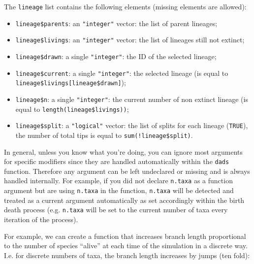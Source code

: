 \documentclass[]{book}
\providecommand{\tightlist}{%
  \setlength{\itemsep}{0pt}\setlength{\parskip}{0pt}}
\begin{document}
The \texttt{lineage} list contains the following elements (missing elements are allowed):

\begin{itemize}
\tightlist
\item
  \texttt{lineage\$parents}: an \texttt{"integer"} vector: the list of parent lineages;
\item
  \texttt{lineage\$livings}: an \texttt{"integer"} vector: the list of lineages still not extinct;
\item
  \texttt{lineage\$drawn}: a single \texttt{"integer"}: the ID of the selected lineage;
\item
  \texttt{lineage\$current}: a single \texttt{"integer"}: the selected lineage (is equal to \texttt{lineage\$livings{[}lineage\$drawn{]}});
\item
  \texttt{lineage\$n}: a single \texttt{"integer"}: the current number of non extinct lineage (is equal to \texttt{length(lineage\$livings))};
\item
  \texttt{lineage\$split}: a \texttt{"logical"} vector: the list of splits for each lineage (\texttt{TRUE}), the number of total tips is equal to \texttt{sum(!lineage\$split)}.
\end{itemize}

In general, unless you know what you're doing, you can ignore most arguments for specific modifiers since they are handled automatically within the \texttt{dads} function.
Therefore any argument can be left undeclared or missing and is always handled internally. For example, if you did not declare \texttt{n.taxa} as a function argument but are using \texttt{n.taxa} in the function, \texttt{n.taxa} will be detected and treated as a current argument automatically as set accordingly within the birth death process (e.g. \texttt{n.taxa} will be set to the current number of taxa every iteration of the process).

For example, we can create a function that increases branch length proportional to the number of species ``alive'' at each time of the simulation in a discrete way. I.e. for discrete numbers of taxa, the branch length increases by jumps (ten fold):
\end{document}
